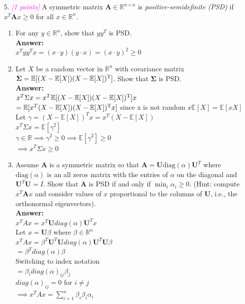 \documentclass{article}
\newcommand{\field}[1]{\mathbb{#1}}
\newcommand{\1}{\mathbf{1}}
\newcommand{\R}{\field{R}} %
\newcommand{\T}{^{\textrm T}} %
\def\diag{\text{diag}}
\newcommand{\mat}[1]{\boldsymbol{#1}} %
\newcommand{\ProbOpr}[1]{\mathbb{#1}}
\newcommand{\grade}[1]{\small\textcolor{magenta}{\emph{[#1 points]}} \normalsize}
\begin{document}
5. \grade{1} A symmetric matrix $\mat{A} \in \R^{n \times n}$ is \emph{positive-semidefinite (PSD)} if $x^T \mat{A} x \geq 0$ for all $x \in \R^n$. 
\begin{enumerate} 
	\item For any $y \in \R^n$, show that $y y^T$ is PSD. \\
	\textbf{Answer:} \\
	$x^Tyy^Tx=(x\cdot y)(y\cdot x)=(x\cdot y)^2\geq0$
	\item Let $X$ be a random vector in $\R^n$ with covariance matrix $\mat{\Sigma} =
\ProbOpr{E}[(X-\ProbOpr{E}[X])(X-\ProbOpr{E}[X])\T]$. Show that $\mat{\Sigma}$ is PSD. \\
\textbf{Answer:} \\
$x^T\Sigma x=x^T\ProbOpr{E}[(X-\ProbOpr{E}[X])(X-\ProbOpr{E}[X])\T]x$\\
$=\ProbOpr{E}[x^T(X-\ProbOpr{E}[X])(X-\ProbOpr{E}[X])\T x]$ since x is not random $x\ProbOpr{E}[X]=\ProbOpr{E}[xX]$\\
Let $\gamma=(X-\ProbOpr{E}[X])^T x=x^T (X-\ProbOpr{E}[X])$\\
$x^T\Sigma x=\ProbOpr{E}[\gamma^2]$\\
$\gamma\in\R\implies\gamma^2\geq0\implies\ProbOpr{E}[\gamma^2]\geq0$\\
$\implies x^T\Sigma x\geq0$

	\item Assume $\mat{A}$ is a symmetric matrix so that $\mat{A} = \mat{U} \diag(\alpha) \mat{U}^T$ where $\diag({\alpha})$ is an all zeros matrix with the entries of ${\alpha}$ on the diagonal and $\mat{U}^T \mat{U} = I$. Show that $\mat{A}$ is PSD if and only if $\min_i \alpha_i \geq 0$. (Hint: compute $x^T \mat{A} x$ and consider values of $x$ proportional to the columns of $\mat{U}$, i.e., the orthonormal eigenvectors).\\
\textbf{Answer:} \\
$x^T A x=x^T \mat{U} diag(\alpha) \mat{U}^T x$\\
Let $x=\mat{U}\beta$ where $\beta \in \R^n$\\
$x^T A x=\beta^T \mat{U}^T \mat{U} diag(\alpha) \mat{U}^T \mat{U} \beta$\\
$=\beta^T diag(\alpha) \beta$\\
Switching to index notation\\
$=\beta_i diag(\alpha)_{ij} \beta_j$\\
$diag(\alpha)_{ij}=0$ for $i\neq j$\\
$\implies x^T A x=\sum_{i=1}^n\beta_i\beta_i\alpha_i$
\end{enumerate}
\end{document}

